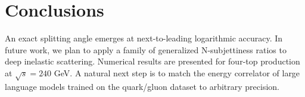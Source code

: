 \section{Conclusions}\label{sec:conclusions}

An exact splitting angle emerges at next-to-leading logarithmic
accuracy. In future work, we plan to apply a family of generalized
N-subjettiness ratios to deep inelastic scattering. Numerical results
are presented for four-top production at $\sqrt{s} = 240$ GeV. A natural
next step is to match the energy correlator of large language models
trained on the quark/gluon dataset to arbitrary precision.

